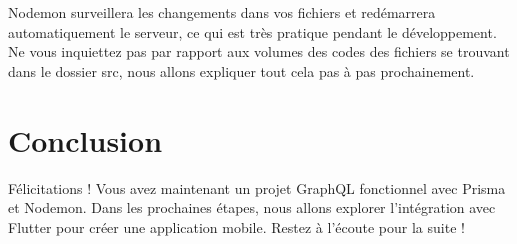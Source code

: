 \documentclass{article}
\begin{document}
Nodemon surveillera les changements dans vos fichiers et redémarrera automatiquement le serveur, ce qui est très pratique pendant le développement.\\
Ne vous inquiettez pas par rapport aux volumes des codes des fichiers se trouvant dans le dossier src, nous allons expliquer tout cela pas à pas prochainement.

\section{Conclusion}
Félicitations ! Vous avez maintenant un projet GraphQL fonctionnel avec Prisma et Nodemon. Dans les prochaines étapes, nous allons explorer l'intégration avec Flutter pour créer une application mobile. Restez à l'écoute pour la suite ! \faSmileO
\end{document}
